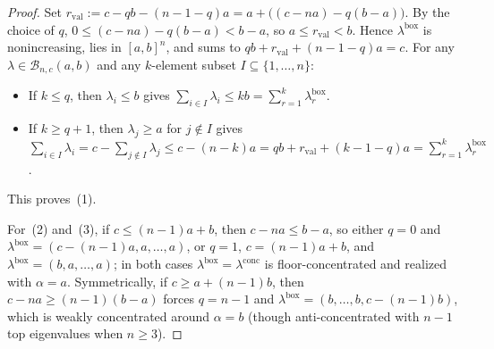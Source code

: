 \documentclass[11pt]{article}
\theoremstyle{definition}
\theoremstyle{remark}
\begin{document}
\begin{proof}
Set $r_{\mathrm{val}} := c - q b - (n - 1 - q)a = a + \bigl((c - n a) - q(b - a)\bigr)$. By the choice of $q$, $0 \le (c - n a) - q(b - a) < b - a$, so $a \le r_{\mathrm{val}} < b$. Hence $\lambda^{\mathrm{box}}$ is nonincreasing, lies in $[a,b]^n$, and sums to $q b + r_{\mathrm{val}} + (n - 1 - q)a = c$. For any $\lambda \in \mathcal{B}_{n,c}(a,b)$ and any $k$-element subset $I \subseteq \{1, \dots, n\}$:
\begin{itemize}
  \item If $k \le q$, then $\lambda_i \le b$ gives $\sum_{i \in I} \lambda_i \le k b = \sum_{r=1}^k \lambda_r^{\mathrm{box}}$.
  \item If $k \ge q + 1$, then $\lambda_j \ge a$ for $j \notin I$ gives $\sum_{i \in I} \lambda_i = c - \sum_{j \notin I} \lambda_j \le c - (n - k)a = q b + r_{\mathrm{val}} + (k - 1 - q)a = \sum_{r=1}^k \lambda_r^{\mathrm{box}}$.
\end{itemize}
This proves~(1).

For~(2) and~(3), if $c \le (n-1)a + b$, then $c - n a \le b - a$, so either $q = 0$ and $\lambda^{\mathrm{box}} = (c - (n-1)a, a, \dots, a)$, or $q = 1$, $c = (n-1)a + b$, and $\lambda^{\mathrm{box}} = (b, a, \dots, a)$; in both cases $\lambda^{\mathrm{box}} = \lambda^{\mathrm{conc}}$ is floor-concentrated and realized with $\alpha = a$. Symmetrically, if $c \ge a + (n-1)b$, then $c - n a \ge (n-1)(b-a)$ forces $q = n - 1$ and $\lambda^{\mathrm{box}} = (b, \dots, b, c - (n-1)b)$, which is weakly concentrated around $\alpha = b$ (though anti-concentrated with $n - 1$ top eigenvalues when $n \ge 3$).


\end{proof}
\end{document}
